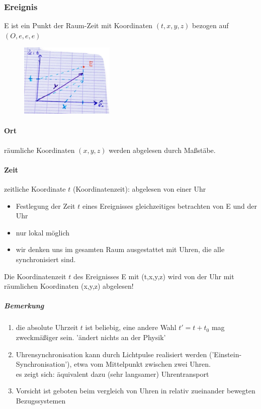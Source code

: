 \subsubsection{Ereignis}
E ist ein Punkt der Raum-Zeit mit Koordinaten $(t,x,y,z)$ bezogen auf $(O,e,e,e)$
\begin{figure}[h]
\begin{center}
\includegraphics[width=0.4\textwidth]{Skizzen/Anhang10.jpg}
\end{center}
\caption{}
\end{figure}
\paragraph*{Ort}
räumliche Koordinaten $(x,y,z)$ werden abgelesen durch Maßstäbe.
\paragraph*{Zeit}
zeitliche Koordinate $t$ (Koordinatenzeit): abgelesen von einer Uhr\\
\begin{itemize}
\item Festlegung der Zeit $t$ eines Ereignisses gleichzeitiges betrachten von E und der Uhr
\item nur lokal möglich
\item wir denken uns im gesamten Raum ausgestattet mit Uhren, die alle synchronisiert sind.\\
\end{itemize}
Die Koordinatenzeit $t$ des Ereignisses E mit (t,x,y,z) wird von der Uhr mit räumlichen Koordinaten (x,y,z) abgelesen!

\subparagraph*{Bemerkung} 
\begin{enumerate}
\item die absolute Uhrzeit $t$ ist beliebig, eine andere Wahl $t'=t+t_0$ mag zweckmäßiger sein. 'ändert nichts an der Physik'
\item Uhrensynchronisation kann durch Lichtpulse realisiert werden ('Einstein-Synchronisation'), etwa vom Mittelpunkt zwischen zwei Uhren.\\
es zeigt sich: äquivalent dazu (sehr langsamer) Uhrentransport
\item Vorsicht ist geboten beim vergleich von Uhren in relativ zueinander bewegten Bezugssystemen
\end{enumerate}
